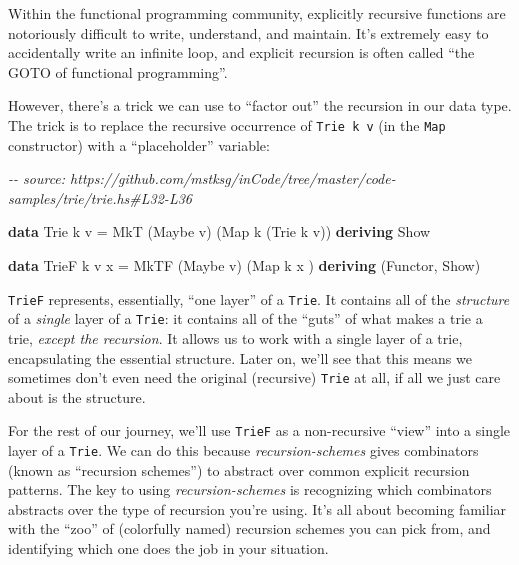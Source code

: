 \documentclass[]{article}
\newenvironment{Shaded}{}{}
\newcommand{\CommentTok}[1]{\textcolor[rgb]{0.38,0.63,0.69}{\textit{#1}}}
\newcommand{\DataTypeTok}[1]{\textcolor[rgb]{0.56,0.13,0.00}{#1}}
\newcommand{\KeywordTok}[1]{\textcolor[rgb]{0.00,0.44,0.13}{\textbf{#1}}}
\newcommand{\NormalTok}[1]{#1}
\newcommand{\OtherTok}[1]{\textcolor[rgb]{0.00,0.44,0.13}{#1}}
\begin{document}
Within the functional programming community, explicitly recursive functions are
notoriously difficult to write, understand, and maintain. It's extremely easy to
accidentally write an infinite loop, and explicit recursion is often called
``the GOTO of functional programming''.

However, there's a trick we can use to ``factor out'' the recursion in our data
type. The trick is to replace the recursive occurrence of \texttt{Trie\ k\ v}
(in the \texttt{Map} constructor) with a ``placeholder'' variable:

\begin{Shaded}
\begin{Highlighting}[]
\CommentTok{{-}{-} source: https://github.com/mstksg/inCode/tree/master/code{-}samples/trie/trie.hs\#L32{-}L36}

\KeywordTok{data} \DataTypeTok{Trie}\NormalTok{  k v   }\OtherTok{=} \DataTypeTok{MkT}\NormalTok{  (}\DataTypeTok{Maybe}\NormalTok{ v) (}\DataTypeTok{Map}\NormalTok{ k (}\DataTypeTok{Trie}\NormalTok{ k v))}
  \KeywordTok{deriving} \DataTypeTok{Show}

\KeywordTok{data} \DataTypeTok{TrieF}\NormalTok{ k v x }\OtherTok{=} \DataTypeTok{MkTF}\NormalTok{ (}\DataTypeTok{Maybe}\NormalTok{ v) (}\DataTypeTok{Map}\NormalTok{ k x         )}
  \KeywordTok{deriving}\NormalTok{ (}\DataTypeTok{Functor}\NormalTok{, }\DataTypeTok{Show}\NormalTok{)}
\end{Highlighting}
\end{Shaded}

\texttt{TrieF} represents, essentially, ``one layer'' of a \texttt{Trie}. It
contains all of the \emph{structure} of a \emph{single} layer of a
\texttt{Trie}: it contains all of the ``guts'' of what makes a trie a trie,
\emph{except the recursion}. It allows us to work with a single layer of a trie,
encapsulating the essential structure. Later on, we'll see that this means we
sometimes don't even need the original (recursive) \texttt{Trie} at all, if all
we just care about is the structure.

For the rest of our journey, we'll use \texttt{TrieF} as a non-recursive
``view'' into a single layer of a \texttt{Trie}. We can do this because
\emph{recursion-schemes} gives combinators (known as ``recursion schemes'') to
abstract over common explicit recursion patterns. The key to using
\emph{recursion-schemes} is recognizing which combinators abstracts over the
type of recursion you're using. It's all about becoming familiar with the
``zoo'' of (colorfully named) recursion schemes you can pick from, and
identifying which one does the job in your situation.
\end{document}
